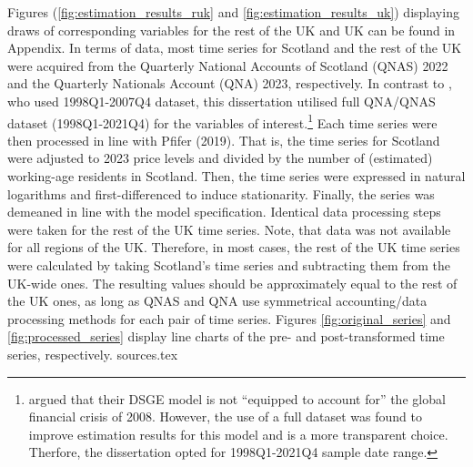 Figures (\ref{fig:estimation_results_ruk} and \ref{fig:estimation_results_uk}) displaying draws of corresponding variables for the rest of the UK and UK can be found in Appendix. In terms of data, most time series for Scotland and the rest of the UK were acquired from the Quarterly National Accounts of Scotland (QNAS) 2022 and the Quarterly Nationals Account (QNA) 2023, respectively. In contrast to \textcite{ricci_2019_essays}, who used 1998Q1-2007Q4 dataset, this dissertation utilised full QNA/QNAS dataset (1998Q1-2021Q4) for the variables of interest.\footnote{\textcite{ricci_2019_essays} argued that their DSGE model is not ``equipped to account for''\parencite[123]{ricci_2019_essays} the global financial crisis of 2008. However, the use of a full dataset was found to improve estimation results for this model and is a more transparent choice. Therfore, the dissertation opted for 1998Q1-2021Q4 sample date range.} Each time series were then processed in line with Pfifer (2019). That is, the time series for Scotland were adjusted to 2023 price levels and divided by the number of (estimated) working-age residents in Scotland. Then, the time series were expressed in natural logarithms and first-differenced to induce stationarity. Finally, the series was demeaned in line with the model specification. Identical data processing steps were taken for the rest of the UK time series. Note, that data was not available for all regions of the UK. Therefore, in most cases, the rest of the UK time series were calculated by taking Scotland's time series and subtracting them from the UK-wide ones. The resulting values should be approximately equal to the rest of the UK ones, as long as QNAS and QNA use symmetrical accounting/data processing methods for each pair of time series. Figures \ref{fig:original_series} and \ref{fig:processed_series} display line charts of the pre- and post-transformed time series, respectively.
{sources.tex}